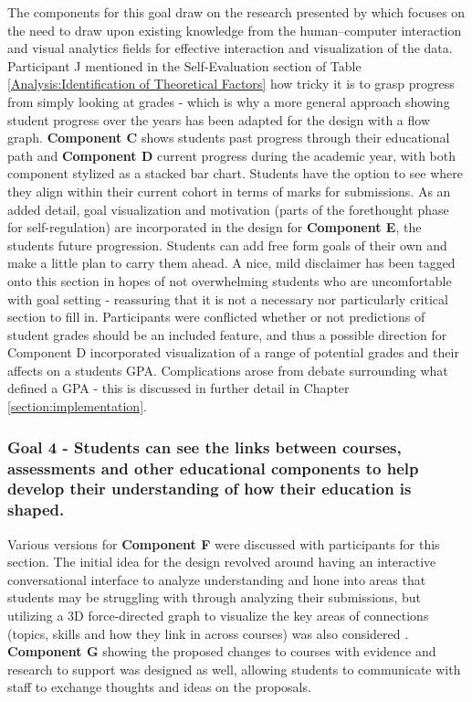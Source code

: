 \documentclass{l4proj}
\begin{document}
The components for this goal draw on the research presented by \citet{Ali2012ATool} which focuses on the need to draw upon existing knowledge from the human–computer interaction and visual analytics fields for effective interaction and visualization of the data. Participant J mentioned in the Self-Evaluation section of Table \ref{Analysis:Identification of Theoretical Factors} how tricky it is to grasp progress from simply looking at grades - which is why a more general approach showing student progress over the years has been adapted for the design with a flow graph. 
\textbf{Component C} shows students past progress through their educational path and \textbf{Component D} current progress during the academic year, with both component stylized as a stacked bar chart. Students have the option to see where they align within their current cohort in terms of marks for submissions. 
As an added detail, goal visualization and motivation (parts of the forethought phase for self-regulation) are incorporated in the design for \textbf{Component E}, the students future progression. Students can add free form goals of their own and make a little plan to carry them ahead. A nice, mild disclaimer has been tagged onto this section in hopes of not overwhelming students who are uncomfortable with goal setting - reassuring that it is not a necessary nor particularly critical section to fill in.
Participants were conflicted whether or not predictions of student grades should be an included feature, and thus a possible direction for Component D incorporated visualization of a range of potential grades and their affects on a students GPA. Complications arose from debate surrounding what defined a GPA - this is discussed in further detail in Chapter \ref{section:implementation}.

\subsubsection{Goal 4 - Students can see the links between courses, assessments and other educational components to help develop their understanding of how their education is shaped. }
\hfill

Various versions for \textbf{Component F} were discussed with participants for this section. The initial idea for the design revolved around having an interactive conversational interface to analyze understanding and hone into areas that students may be struggling with through analyzing their submissions, but utilizing a 3D force-directed graph to visualize the key areas of connections (topics, skills and how they link in across courses) was also considered \citep{boumghar2018enhanced, Asturiano_2023}. \textbf{Component G} showing the proposed changes to courses with evidence and research to support was designed as well, allowing students to communicate with staff to exchange thoughts and ideas on the proposals. 
\end{document}
